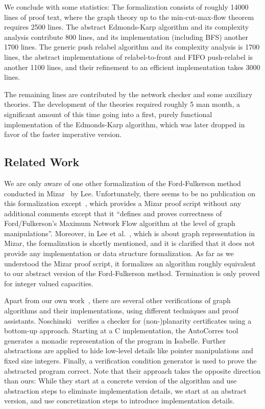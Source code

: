 \documentclass[smallcondensed]{svjour3}     %
\begin{document}
  We conclude with some statistics:
  The formalization consists of roughly 14000 lines of proof text, where the graph theory up to the min-cut-max-flow theorem requires 2500 lines.
  The abstract Edmonds-Karp algorithm and its complexity analysis contribute 800 lines, and its implementation (including BFS) another 1700 lines.
  The generic push relabel algorithm and its complexity analysis is 1700 lines, the abstract implementations of relabel-to-front and FIFO push-relabel is another 1100 lines,
  and their refinement to an efficient implementation takes 3000 lines.
  
  The remaining lines are contributed by the network checker and some auxiliary theories. The development of the theories required roughly 5 man month, a significant amount of this time going into a first, purely functional implementation of the Edmonds-Karp algorithm, which was later dropped in favor of the faster imperative version.
  
  
  \subsection{Related Work}\label{sec:related_work}
  We are only aware of one other formalization of the Ford-Fulkerson method conducted in Mizar~\cite{MaRu05} by Lee. Unfortunately, there seems to be no publication
  on this formalization except~\cite{Lee05}, which provides a Mizar proof script without any additional comments except that it ``defines and proves correctness of Ford/Fulkerson's Maximum Network Flow algorithm at the level of graph manipulations''. Moreover, in Lee et al.~\cite{LeRu07}, which is about graph representation in Mizar, the formalization is shortly mentioned, and it is clarified that it does not provide any implementation or data structure formalization.
  As far as we understood the Mizar proof script, it formalizes an algorithm roughly equivalent to our abstract version of the Ford-Fulkerson method.
  Termination is only proved for integer valued capacities.
  
  Apart from our own work~\cite{La14,NoLa12}, there are several other verifications of graph algorithms and their implementations, using different techniques and proof assistants. Noschinski~\cite{Nosch15} verifies a checker for (non-)planarity certificates using a bottom-up approach. Starting at a C implementation,
  the AutoCorres tool~\cite{Greenaway15,GAK12} generates a monadic representation of the program in Isabelle. Further abstractions are applied
  to hide low-level details like pointer manipulations and fixed size integers. Finally, a verification condition
  generator is used to prove the abstracted program correct. Note that their approach takes the opposite direction than ours: While they start at a concrete version of the algorithm and use abstraction steps to eliminate implementation details, we start at an abstract version, and use concretization steps to introduce implementation details.
\end{document}
